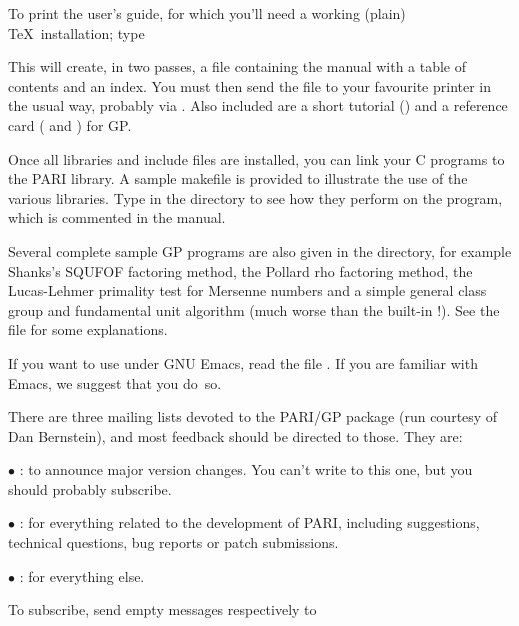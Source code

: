  To print the user's guide, for which you'll
need a working (plain) \TeX\ installation; type


\noindent This will create, in two passes, a file 
containing the manual with a table of contents and an index. You must then
send the  file to your favourite printer in the usual way,
probably via . Also included are a short tutorial
() and a reference card (
and ) for GP.

 Once all libraries and include files are installed,
you can link your C programs to the PARI library. A sample makefile
 is provided to illustrate the use of the various
libraries. Type  in the  directory to see how
they perform on the  program, which is commented in the
manual.

 Several complete sample GP programs are also given in
the  directory, for example Shanks's SQUFOF factoring method,
the Pollard rho factoring method, the Lucas-Lehmer primality test for
Mersenne numbers and a simple general class group and fundamental unit
algorithm (much worse than the built-in !). See the file
 for some explanations.

 If you want to use  under GNU Emacs, read the file
. If you are familiar with Emacs, we suggest that
you do~so.

 There are three mailing lists devoted to the
PARI/GP package (run courtesy of Dan Bernstein), and most feedback should be
directed to those. They are:

$\bullet$ : to announce major version changes. You can't
write to this one, but you should probably subscribe.

$\bullet$ : for everything related to the development of PARI,
including suggestions, technical questions, bug reports or patch submissions.

$\bullet$ : for everything else.

To subscribe, send empty messages respectively to

\centerline{}

\centerline{}

